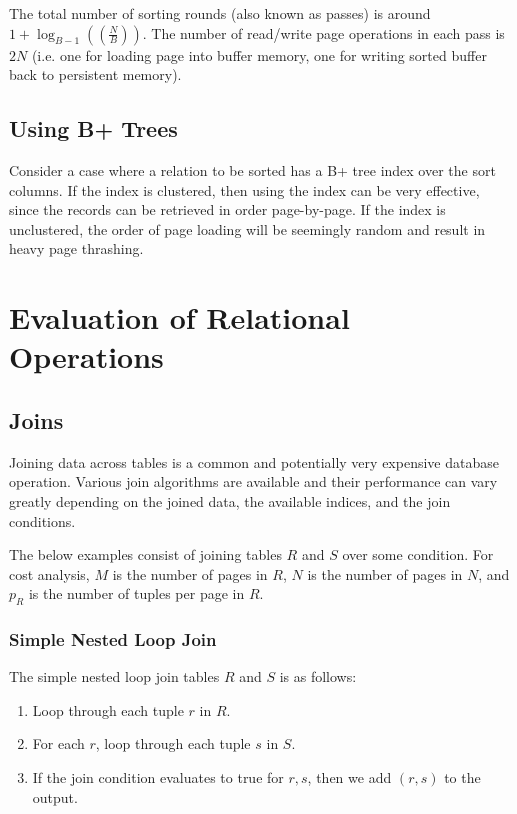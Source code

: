 \documentclass[12pt,titlepage]{article}
\let\stdsection\section
\renewcommand\section{\clearpage\stdsection}
\begin{document}
      The total number of sorting rounds (also known as passes) is around $1 + \log_{B-1}((\frac{N}{B}))$. The number of read/write page operations in each
      pass is $2N$ (i.e. one for loading page into buffer memory, one for writing sorted buffer back to persistent memory).

    \subsection{Using B+ Trees}
      Consider a case where a relation to be sorted has a B+ tree index over the sort columns. If the index is clustered, then using the index can be very
      effective, since the records can be retrieved in order page-by-page. If the index is unclustered, the order of page loading will be seemingly random
      and result in heavy page thrashing.

  \section{Evaluation of Relational Operations}

    \subsection{Joins}
      Joining data across tables is a common and potentially very expensive database operation. Various join algorithms are available and their performance
      can vary greatly depending on the joined data, the available indices, and the join conditions.

      The below examples consist of joining tables $R$ and $S$ over some condition. For cost analysis, $M$ is the number of pages in $R$, $N$ is the number
      of pages in $N$, and $p_R$ is the number of tuples per page in $R$.

      \subsubsection{Simple Nested Loop Join}
        The simple nested loop join tables $R$ and $S$ is as follows:
        \begin{enumerate}
          \item Loop through each tuple $r$ in $R$.
          \item For each $r$, loop through each tuple $s$ in $S$.
          \item If the join condition evaluates to true for $r, s$, then we add $(r, s)$ to the output.
        \end{enumerate}
\end{document}
